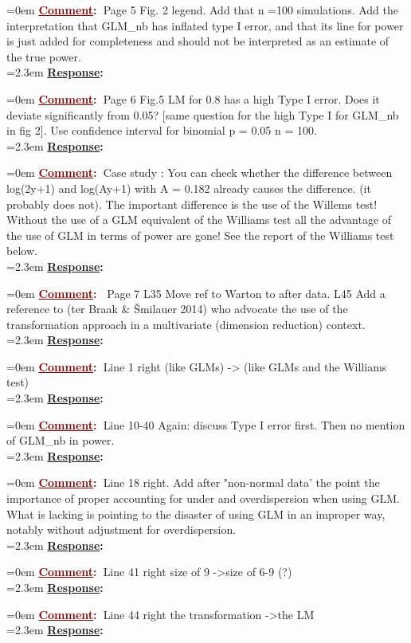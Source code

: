\documentclass[12pt]{article}
\newcommand{\comment}[0]{\vspace{1em} \noindent \hangindent=0em \textbf{\textcolor{Maroon}{\uline{Comment}:~}}}
\newcommand{\response}[0]{\\\vspace{0.1em} \hangindent=2.3em \textbf{\textcolor{NavyBlue}{\uline{Response}:~}}}
\begin{document}
\comment Page 5
Fig. 2 legend. Add that n =100 simulations. Add the interpretation that  GLM\_nb has inflated type I error, and that its line for power is just added for completeness and should not be interpreted as an estimate of the true power.
\response

\comment Page 6
Fig.5 LM for 0.8 has a high Type I error. Does it deviate significantly from 0.05? [same question for the high Type I for GLM\_nb in fig 2]. Use confidence interval for binomial p = 0.05 n = 100.
\response

\comment Case study : 
You can check whether the difference between log(2y+1) and log(Ay+1) with A = 0.182 already causes the difference. (it probably does not). The important difference is the use of the Willems test! Without the use of a GLM equivalent of the Williams test all the advantage of the use of GLM in terms of power are gone! See the report of the Williams test below.
\response

\comment 
Page 7
L35 Move ref to Warton to after data.
L45 Add a reference to (ter Braak \& Šmilauer 2014) who advocate the use of the transformation approach in a multivariate (dimension reduction) context.
\response

\comment Line 1 right (like GLMs) -> (like GLMs and the Williams test)
\response

\comment Line 10-40 Again: discuss Type I error first. Then no mention of GLM\_nb in power.
\response

\comment Line 18 right. Add after "non-normal data' the point the importance of proper accounting for under and overdispersion when using GLM. What is lacking is pointing to the disaster of using GLM in an improper way, notably without adjustment for overdispersion.
\response

\comment Line 41 right size of 9 -\textgreater size of 6-9 (?)
\response

\comment Line 44 right the transformation -\textgreater the LM
\response



\end{document}
